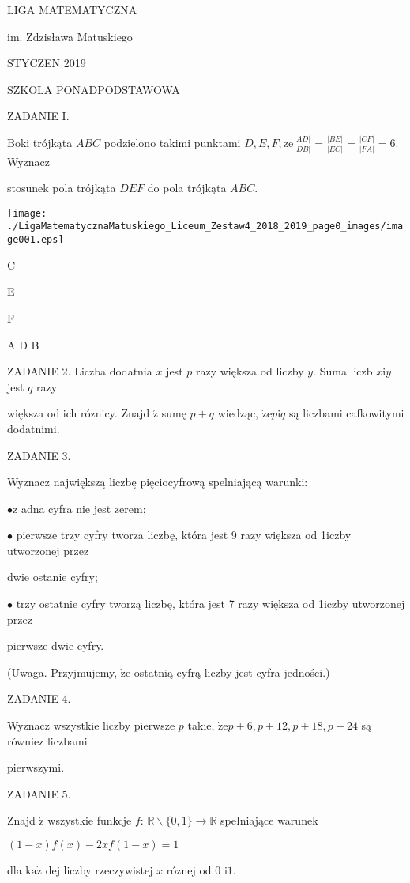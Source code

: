 \documentclass[a4paper,12pt]{article}
\begin{document}
LIGA MATEMATYCZNA

im. Zdzisława Matuskiego

STYCZEN 2019

SZKOLA PONADPODSTAWOWA

ZADANIE I.

Boki trójkąta $ABC$ podzielono takimi punktami $D, E, F, \displaystyle \dot{\mathrm{z}}\mathrm{e}\frac{|AD|}{|DB|}=\frac{|BE|}{|EC|}=\frac{|CF|}{|FA|}=6$. Wyznacz

stosunek pola trójkąta $DEF$ do pola trójkąta $ABC.$
\begin{center}
\texttt{[image: ./LigaMatematycznaMatuskiego\_Liceum\_Zestaw4\_2018\_2019\_page0\_images/image001.eps]}
\end{center}
C

E

F

A  D  B

ZADANIE 2. Liczba dodatnia $x$ jest $p$ razy większa od liczby $y$. Suma liczb $x\mathrm{i}y$ jest $q$ razy

większa od ich róznicy. Znajd $\acute{\mathrm{z}}$ sumę $p+q$ wiedząc, $\dot{\mathrm{z}}\mathrm{e}p\mathrm{i}q$ są liczbami cafkowitymi dodatnimi.

ZADANIE 3.

Wyznacz największą liczbę pięciocyfrową spelniającą warunki:

$\bullet \dot{\mathrm{z}}$ adna cyfra nie jest zerem;

$\bullet$ pierwsze trzy cyfry tworza liczbę, która jest 9 razy większa od 1iczby utworzonej przez

dwie ostanie cyfry;

$\bullet$ trzy ostatnie cyfry tworzą liczbę, która jest 7 razy większa od 1iczby utworzonej przez

pierwsze dwie cyfry.

(Uwaga. Przyjmujemy, $\dot{\mathrm{z}}\mathrm{e}$ ostatnią cyfrą liczby jest cyfra jedności.)

ZADANIE 4.

Wyznacz wszystkie liczby pierwsze $p$ takie, $\dot{\mathrm{z}}\mathrm{e}p+6, p+12, p+18, p+24$ są równiez liczbami

pierwszymi.

ZADANIE 5.

Znajd $\acute{\mathrm{z}}$ wszystkie funkcje $f$: $\mathbb{R}\backslash \{0,1\}\rightarrow \mathbb{R}$ spełniające warunek

$(1-x)f(x)-2xf(1-x)=1$

dla $\mathrm{k}\mathrm{a}\dot{\mathrm{z}}$ dej liczby rzeczywistej $x$ róznej od 0 $\mathrm{i}1.$
\end{document}
